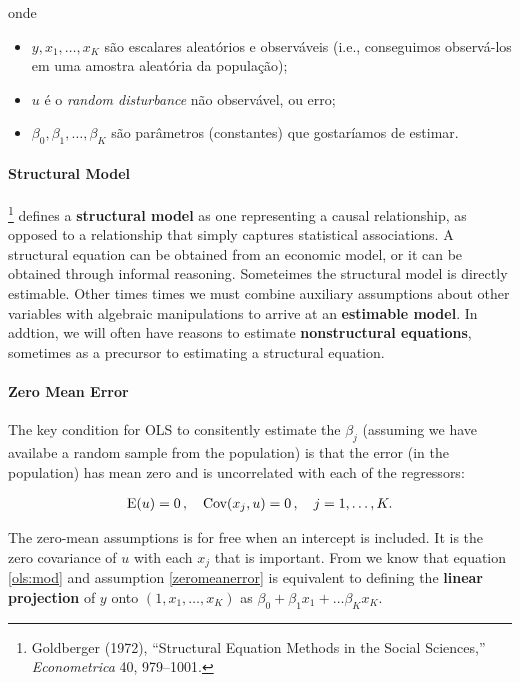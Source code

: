 \documentclass[11pt, oneside, a4paper, article]{article}
\numberwithin{equation}{section}
\begin{document}
\noindent
onde

\begin{itemize} \itemsep0pt
\item $y, x_{1}, \dots, x_{K}$  são escalares aleatórios e observáveis (i.e., conseguimos observá-los em uma amostra aleatória da população);

\item $u$ é o \textit{random disturbance} não observável, ou erro; 

\item $\beta_{0}, \beta_{1}, \dots, \beta_{K}$ são parâmetros (constantes) que gostaríamos de estimar.
\end{itemize}

\paragraph{Structural Model}
\footnote{Goldberger (1972), ``Structural Equation Methods in the Social Sciences,'' \textit{Econometrica} 40, 979--1001.}
defines a \textbf{structural model} as one representing a causal relationship, as opposed to a relationship that simply captures statistical associations.
A structural equation can be obtained from an economic model, or it can be obtained through informal reasoning.
Someteimes the structural model is directly estimable.
Other times times we must combine auxiliary assumptions about other variables with algebraic manipulations to arrive at an \textbf{estimable model}.
In addtion, we will often have reasons to estimate \textbf{nonstructural equations}, sometimes as a precursor to estimating a structural equation.

\paragraph{Zero Mean Error}
The key condition for OLS to consitently estimate the $\beta_{j}$ (assuming we have availabe a random sample from the population) is that the error (in the population) has mean zero and is uncorrelated with each of the regressors:

\vspace{-1 em}
\begin{align} \label{zeromeanerror}
	\text{E}( u ) = 0 \, , \quad \text{Cov}(x_{j}, u) = 0 \, , \quad j = 1, \dots, K.
\end{align}

The zero-mean assumptions is for free when an intercept is included.
It is the zero covariance of $u$ with each $x_{j}$ that is important.
From  we know that equation \eqref{ols:mod} and assumption \eqref{zeromeanerror} is equivalent to defining the \textbf{linear projection} of $y$ onto 
$(1, x_{1}, \dots, x_{K})$ as
$\beta_{0} + \beta_{1} x_{1} + \dots \beta_{K} x_{K}$.
\end{document}

